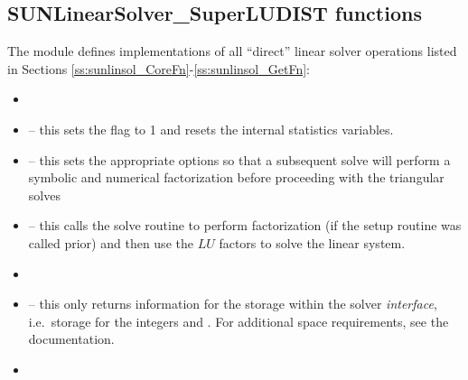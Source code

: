 \subsection{SUNLinearSolver\_SuperLUDIST functions}\label{ss:sunlinsol_sludist_functions}

The {\sunlinsolsludist} module defines implementations of all
``direct'' linear solver operations listed in Sections
\ref{ss:sunlinsol_CoreFn}-\ref{ss:sunlinsol_GetFn}:
\begin{itemize}
\item {}
\item {} -- this sets the
   flag to 1 and resets the internal {\superludist}
  statistics variables.
\item {} -- this sets the appropriate
  {\superludist} options so that a subsequent solve will perform a
  symbolic and numerical factorization before proceeding with the
  triangular solves
\item {} -- this calls the {\superludist}
  solve routine to perform factorization (if the setup routine
  was called prior) and then use the $LU$ factors to solve the
  linear system.
\item {}
\item {} -- this only returns information for
  the storage within the solver \emph{interface}, i.e.~storage for the
  integers  and .  For additional
  space requirements, see the {\superludist} documentation.
\item {}
\end{itemize}

